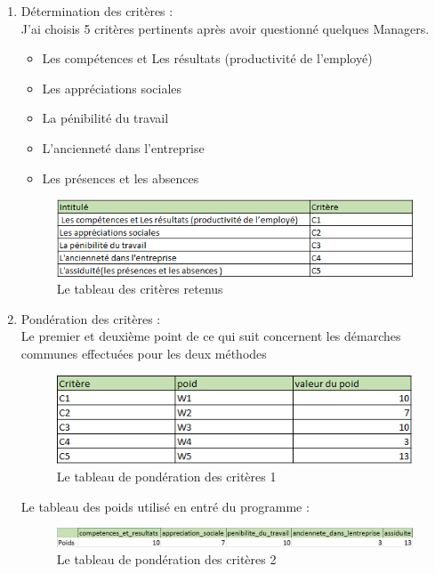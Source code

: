 \begin{enumerate}
\item Détermination des critères :
\\
J’ai choisis 5 critères pertinents après avoir questionné quelques Managers.
      \begin{itemize}
      \item Les compétences et Les résultats (productivité de l’employé)
      \item Les appréciations sociales
      \item La pénibilité du travail
      \item L’ancienneté dans l'entreprise
      \item Les présences et les absences     
      \end{itemize}
      
\begin{figure}[!h]
\begin{center}
\includegraphics{Conception_implementation/noms_criteres.png}
\end{center}
\caption{Le tableau des critères retenus}
\end{figure}

\newpage

\item Pondération des critères :
\\
Le premier et deuxième point de ce qui suit concernent les démarches communes effectuées pour les deux méthodes

\begin{figure}[!h]
\begin{center}
\includegraphics{Conception_implementation/poids.png}
\end{center}
\caption{Le tableau de pondération des critères 1}
\end{figure}


Le tableau des poids utilisé en entré du programme :
\begin{figure}[!h]
\begin{center}
\includegraphics[width=16cm]{Conception_implementation/poids_en_entr_s.png}
\end{center}
\caption{Le tableau de pondération des critères 2}
\end{figure}



\end{enumerate}
